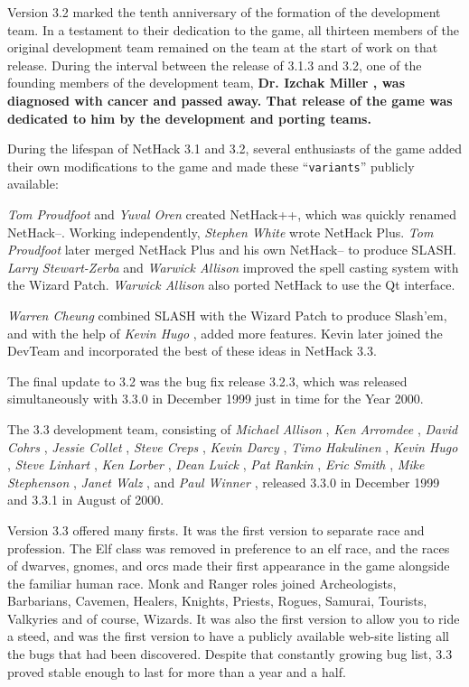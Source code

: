 Version 3.2 marked the tenth anniversary of the formation of the development
team.  In a testament to their dedication to the game, all thirteen members
of the original development team remained on the team at the start of work
on that release.  During the interval between the release of 3.1.3
and 3.2, one of the founding members of the development team, %
\bf Dr. Izchak
Miller\rm%
, was diagnosed with cancer and passed away.  That release of the
game was dedicated to him by the development and porting teams.

During the lifespan of NetHack 3.1 and 3.2, several enthusiasts
of the game added
their own modifications to the game and made these ``{\tt variants}'' publicly
available:

%
{\it Tom Proudfoot}%
and %
{\it Yuval Oren}%
created NetHack++,
which was quickly renamed NetHack--.
Working independently, %
{\it Stephen White}%
wrote NetHack Plus.
%
{\it Tom Proudfoot}%
later merged NetHack Plus
and his own NetHack-- to produce SLASH.
%
{\it Larry Stewart-Zerba}%
and %
{\it Warwick Allison}%
improved the spell
casting system with the Wizard Patch.
%
{\it Warwick Allison}%
also ported NetHack to use the Qt interface.

%
{\it Warren Cheung}%
combined SLASH with the Wizard Patch to produce Slash'em,
and with the help of %
{\it Kevin Hugo}%
, added more features.
Kevin later joined the
DevTeam and incorporated the best of these ideas in NetHack 3.3.

The final update to 3.2 was the bug fix release 3.2.3, which was released
simultaneously with 3.3.0 in December 1999 just in time for the Year 2000.

The 3.3 development team, consisting of %
{\it Michael Allison}%
, %
{\it Ken Arromdee}%
, 
%
{\it David Cohrs}%
, %
{\it Jessie Collet}%
, %
{\it Steve Creps}%
, %
{\it Kevin Darcy}%
, 
%
{\it Timo Hakulinen}%
, %
{\it Kevin Hugo}%
, %
{\it Steve Linhart}%
, %
{\it Ken Lorber}%
, 
%
{\it Dean Luick}%
, %
{\it Pat Rankin}%
, %
{\it Eric Smith}%
, %
{\it Mike Stephenson}%
, 
%
{\it Janet Walz}%
, and %
{\it Paul Winner}%
, released 3.3.0 in 
December 1999 and 3.3.1 in August of 2000.

Version 3.3 offered many firsts. It was the first version to separate race 
and profession. The Elf class was removed in preference to an elf race, 
and the races of dwarves, gnomes, and orcs made their first appearance in 
the game alongside the familiar human race.  Monk and Ranger roles joined 
Archeologists, Barbarians, Cavemen, Healers, Knights, Priests, Rogues, Samurai, 
Tourists, Valkyries and of course, Wizards.  It was also the first version
to allow you to ride a steed, and was the first version to have a publicly 
available web-site listing all the bugs that had been discovered.  Despite 
that constantly growing bug list, 3.3 proved stable enough to last for
more than a year and a half.

